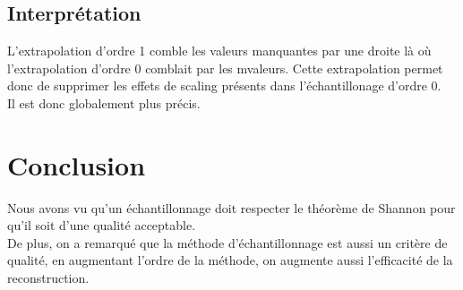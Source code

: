 \documentclass[a4paper, oneside]{report}
\begin{document}
\subsection{Interpr\'etation}

L'extrapolation d'ordre 1 comble les valeurs manquantes par une droite l\`a o\`u l'extrapolation d'ordre 0 comblait par les m valeurs. Cette extrapolation permet donc de supprimer les effets de scaling pr\'esents dans l'\'echantillonage d'ordre 0.\\
Il est donc globalement plus précis.

\section{Conclusion}

Nous avons vu qu'un \'echantillonnage doit respecter le th\'eor\`eme de Shannon pour qu'il soit d'une qualit\'e acceptable.\\

De plus, on a remarqu\'e que la m\'ethode d'\'echantillonnage est aussi un crit\`ere de qualit\'e, en augmentant l'ordre de la m\'ethode, on augmente aussi l'efficacit\'e de la reconstruction.  
\end{document}
